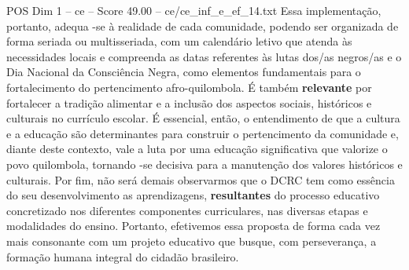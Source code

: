 \begin{textsample}{POS Dim 1 – ce – Score 49.00 – ce/ce\_inf\_e\_ef\_14.txt}
Essa implementação, portanto, adequa -se à realidade de cada comunidade, podendo ser organizada de forma seriada ou multisseriada, com um calendário letivo que atenda às necessidades locais e compreenda as datas referentes às lutas dos/as negros/as e o Dia Nacional da Consciência Negra, como elementos fundamentais para o fortalecimento do pertencimento afro-quilombola.
É também \textbf{relevante} por fortalecer a tradição alimentar e a inclusão dos aspectos sociais, históricos e culturais no currículo escolar.
É essencial, então, o entendimento de que a cultura e a educação são determinantes para construir o pertencimento da comunidade e, diante deste contexto, vale a luta por uma educação significativa que valorize o povo quilombola, tornando -se decisiva para a manutenção dos valores históricos e culturais.
Por fim, não será demais observarmos que o DCRC tem como essência do seu desenvolvimento as aprendizagens, \textbf{resultantes} do processo educativo concretizado nos diferentes componentes curriculares, nas diversas etapas e modalidades do ensino.
Portanto, efetivemos essa proposta de forma cada vez mais consonante com um projeto educativo que busque, com perseverança, a formação humana integral do cidadão brasileiro.

\end{textsample}
